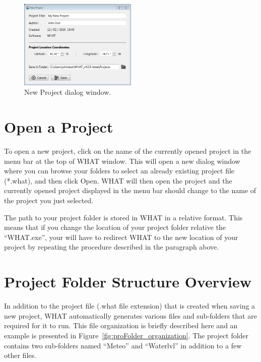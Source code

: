 \documentclass[WHATMANUAL.tex]{subfiles}
\begin{document}
\begin{figure}[!ht]
\centering
\includegraphics[width=0.5\textwidth]{img/WHAT_Screenshot_newproject}
\caption[New Project dialog window.]{New Project dialog window.}
\label{fig:new_proj_win}
\end{figure}

\FloatBarrier

\section{Open a Project}

To open a new project, click on the name of the currently opened project in the menu bar at the top of WHAT window. This will open a new dialog window where you can browse your folders to select an already existing project file (*.what), and then click Open. WHAT will then open the project and the currently opened project displayed in the menu bar should change to the name of the project you just selected.

The path to your project folder is stored in WHAT in a relative format. This means that if you change the location of your project folder relative the ``WHAT.exe'', your will have to redirect WHAT to the new location of your project by repeating the procedure described in the paragraph above.

\section{Project Folder Structure Overview}\label{subsec:folder_structure}

In addition to the project file (.what file extension) that is created when saving a new project, WHAT automatically generates various files and sub-folders that are required for it to run. This file organization is briefly described here and an example is presented in Figure~\ref{fig:proFolder_organization}. The project folder contains two sub-folders named ``Meteo'' and ``Waterlvl'' in addition to a few other files.
\end{document}
